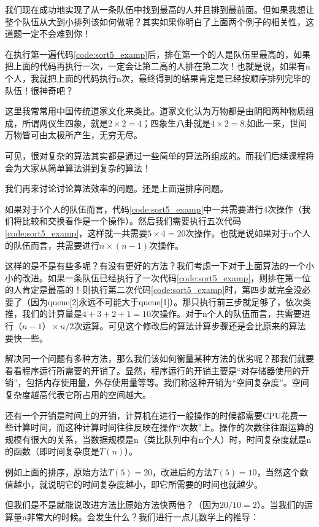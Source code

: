 我们现在成功地实现了从一条队伍中找到最高的人并且排到最前面。但如果我想让整个队伍从大到小排列该如何做呢？其实如果你明白了上面两个例子的相关性，这道题一定不会难到你！

在执行第一遍代码\ref{code:sort5_examp}后，排在第一个的人是队伍里最高的，如果把上面的代码再执行一次，一定会让第二高的人排在第二次！也就是说，如果有n个人，我就把上面的代码执行n次，最终得到的结果肯定是已经按顺序排列完毕的队伍！很神奇吧？

这里我常常用中国传统道家文化来类比。道家文化认为万物都是由阴阳两种物质组成，所谓两仪生四象，就是$2\times2=4$；四象生八卦就是$4\times2=8$.如此一来，世间万物皆可由太极所产生，无穷无尽。

可见，很对复杂的算法其实都是通过一些简单的算法所组成的。而我们后续课程将会为大家从简单算法讲到复杂的算法！

我们再来讨论讨论算法效率的问题。还是上面道排序问题。

如果对于5个人的队伍而言，代码\ref{code:sort5_examp}中一共需要进行4次操作（我们将比较和交换看作是一个操作）。然后我们需要执行五次代码\ref{code:sort5_examp}，这样就一共需要$5\times4=20$次操作。也就是说如果对于n个人的队伍而言，共需要进行$n\times(n-1)$次操作。

这样的是不是有些多呢？有没有更好的方法？我们考虑一下对于上面算法的一个小小的改进。如果一条队伍已经执行了一次代码\ref{code:sort5_examp}，则排在第一位的人肯定是最高的！则执行第二次代码\ref{code:sort5_examp}时，第四步就完全没必要了（因为queue[2]永远不可能大于queue[1]）。那只执行前三步就足够了，依次类推，我们的计算量是$4+3+2+1=10$次操作。对于n个人的队伍而言，共需要进行$（n-1）\times n/2$次运算。可见这个修改后的算法计算步骤还是会比原来的算法要快一些。

解决同一个问题有多种方法，那么我们该如何衡量某种方法的优劣呢？那我们就要看看程序运行所需要的开销了。显然，程序运行的开销主要是“对存储器使用的开销”，包括内存使用量，外存使用量等等。我们称这种开销为“空间复杂度”。空间复杂度越高代表它所占用的空间越大。

还有一个开销是时间上的开销，计算机在进行一般操作的时候都需要CPU花费一些计算时间，而这种计算时间往往反映在操作“次数”上。操作的次数往往跟运算的规模有很大的关系，当数据规模是n（类比队列中有n个人）时，时间复杂度就是n的函数（即时间复杂度是$T(n)$）。

例如上面的排序，原始方法$T(5)=20$，改进后的方法$T(5)=10$，当然这个数值越小，就说明它的时间复杂度越小，即它所需要的时间也就越少。

但我们是不是就能说改进方法比原始方法快两倍？（因为$20/10=2$）。当我们的运算量n非常大的时候。会发生什么？我们进行一点儿数学上的推导：

